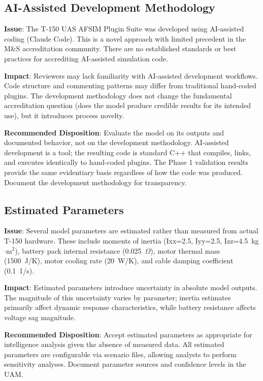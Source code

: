 \documentclass[11pt, letterpaper]{article}
\begin{document}
\subsection{\unclass AI-Assisted Development Methodology}

\unclass \textbf{Issue}: The T-150 UAS AFSIM Plugin Suite was developed using AI-assisted coding (Claude Code). This is a novel approach with limited precedent in the M\&S accreditation community. There are no established standards or best practices for accrediting AI-assisted simulation code.

\unclass \textbf{Impact}: Reviewers may lack familiarity with AI-assisted development workflows. Code structure and commenting patterns may differ from traditional hand-coded plugins. The development methodology does not change the fundamental accreditation question (does the model produce credible results for its intended use), but it introduces process novelty.

\unclass \textbf{Recommended Disposition}: Evaluate the model on its outputs and documented behavior, not on the development methodology. AI-assisted development is a tool; the resulting code is standard C++ that compiles, links, and executes identically to hand-coded plugins. The Phase 1 validation results provide the same evidentiary basis regardless of how the code was produced. Document the development methodology for transparency.

\subsection{\unclass Estimated Parameters}

\unclass \textbf{Issue}: Several model parameters are estimated rather than measured from actual T-150 hardware. These include moments of inertia (Ixx=2.5, Iyy=2.5, Izz=4.5~kg$\cdot$m$^2$), battery pack internal resistance (0.025~$\Omega$), motor thermal mass (1500~J/K), motor cooling rate (20~W/K), and cable damping coefficient (0.1~1/s).

\unclass \textbf{Impact}: Estimated parameters introduce uncertainty in absolute model outputs. The magnitude of this uncertainty varies by parameter; inertia estimates primarily affect dynamic response characteristics, while battery resistance affects voltage sag magnitude.

\unclass \textbf{Recommended Disposition}: Accept estimated parameters as appropriate for intelligence analysis given the absence of measured data. All estimated parameters are configurable via scenario files, allowing analysts to perform sensitivity analyses. Document parameter sources and confidence levels in the UAM.
\end{document}

